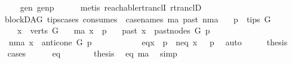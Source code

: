 \begin{isabellebody}
\ \ \ \ \isamarkupfalse%
\ gen\ genp\isanewline
\ \ \ \ \isamarkupfalse%
\ {\isacharparenleft}{\kern0pt}metis\ reachable{\isacharunderscore}{\kern0pt}rtranclI\ rtranclD{\isacharparenright}{\kern0pt}\ \isanewline
{}\isamarkupfalse%
%
\endisatagproof
{\isafoldproof}%
%
\isadelimproof
\isanewline
%
\endisadelimproof
\isanewline
\isanewline
{}\isamarkupfalse%
\ {\isacharparenleft}{\kern0pt}\ blockDAG{\isacharparenright}{\kern0pt}\ tips{\isacharunderscore}{\kern0pt}cases\ {\isacharbrackleft}{\kern0pt}consumes\ {}{\isacharcomma}{\kern0pt}\ case{\isacharunderscore}{\kern0pt}names\ ma\ past\ nma{\isacharbrackright}{\kern0pt}{\isacharcolon}{\kern0pt}\isanewline
\ \ \ {\isachardoublequoteopen}p\ {\isasymin}\ tips\ G{\isachardoublequoteclose}\isanewline
\ \ \ \ \ {\isachardoublequoteopen}x\ {\isasymin}\ verts\ G{\isachardoublequoteclose}\isanewline
\ \ \ {\isacharparenleft}{\kern0pt}ma{\isacharparenright}{\kern0pt}\ {\isachardoublequoteopen}x\ {\isacharequal}{\kern0pt}\ p{\isachardoublequoteclose}\isanewline
\ \ {\isacharbar}{\kern0pt}\ {\isacharparenleft}{\kern0pt}past{\isacharparenright}{\kern0pt}\ {\isachardoublequoteopen}x\ {\isasymin}\ past{\isacharunderscore}{\kern0pt}nodes\ G\ p{\isachardoublequoteclose}\isanewline
\ \ {\isacharbar}{\kern0pt}\ {\isacharparenleft}{\kern0pt}nma{\isacharparenright}{\kern0pt}\ {\isachardoublequoteopen}x\ {\isasymin}\ anticone\ G\ p{\isachardoublequoteclose}\ \ \ \ \ \ \isanewline
%
\isadelimproof
%
\endisadelimproof
%
\isatagproof
{}\isamarkupfalse%
\ {\isacharminus}{\kern0pt}\isanewline
\ \ \isamarkupfalse%
\ {\isacharparenleft}{\kern0pt}eq{\isacharparenright}{\kern0pt}{\isachardoublequoteopen}x\ {\isacharequal}{\kern0pt}\ p{\isachardoublequoteclose}\ {\isacharbar}{\kern0pt}\ {\isacharparenleft}{\kern0pt}neq{\isacharparenright}{\kern0pt}\ {\isachardoublequoteopen}{\isasymnot}x\ {\isacharequal}{\kern0pt}\ \ p{\isachardoublequoteclose}\ \isamarkupfalse%
\ auto\isanewline
\ \ \isamarkupfalse%
\ \isamarkupfalse%
\ {\isacharquery}{\kern0pt}thesis\isanewline
\ \ \isamarkupfalse%
{\isacharparenleft}{\kern0pt}cases{\isacharparenright}{\kern0pt}\isanewline
\ \ \ \ \isamarkupfalse%
\ eq\isanewline
\ \ \ \ \isamarkupfalse%
\ \isamarkupfalse%
\ thesis\ \isamarkupfalse%
\ eq\ ma\ \isamarkupfalse%
\ simp\isanewline

\end{isabellebody}
